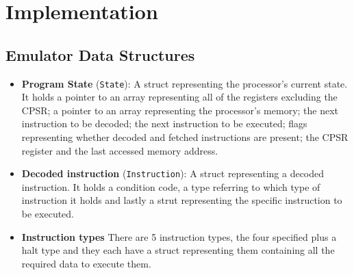 \documentclass[8pt]{article}
\begin{document}
\section{Implementation}

\subsection{Emulator Data Structures}

\begin{itemize}

    \item \textbf{Program State} (\texttt{State}): A struct representing the 
    processor's current state. It holds a pointer to an array representing 
    all of the registers excluding the CPSR; a pointer to an array
    representing the processor's memory; the next instruction to be decoded; the 
    next instruction to be executed; flags representing whether decoded
    and fetched instructions are present; 
    the CPSR register and the last accessed memory address.
    
    \item \textbf{Decoded instruction} (\texttt{Instruction}): A struct representing
    a decoded instruction. It holds a condition code, a type referring to which type of 
    instruction it holds and lastly a strut representing the specific instruction to be executed.
    
    \item \textbf{Instruction types} There are 5 instruction types, the four specified 
    plus a halt type and they each have a struct
    representing them containing all the required data to execute them.

    
    \end{itemize}
\end{document}
